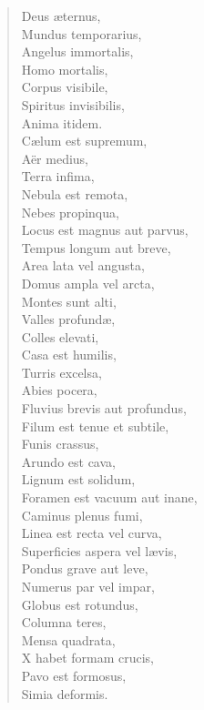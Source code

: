 \begin{verse}

  Deus æternus,\\
  Mundus temporarius,\\
  Angelus immortalis,\\
  Homo mortalis,\\
  Corpus visibile,\\
  Spiritus invisibilis,\\
  Anima itidem.\\
  Cælum est supremum,\\
  Aër medius,\\
  Terra infima,\\
  Nebula est remota,\\
  Nebes propinqua,\\
  Locus est magnus aut parvus,\\
  Tempus longum aut breve,\\
  Area lata vel angusta,\\
  Domus ampla vel arcta,\\
  Montes sunt alti,\\
  Valles profundæ,\\
  Colles elevati,\\
  Casa est humilis,\\
  Turris excelsa,\\
  Abies pocera,\\
  Fluvius brevis aut profundus,\\
  Filum est tenue et subtile,\\
  Funis crassus,\\
  Arundo est cava,\\
  Lignum est solidum,\\
  Foramen est vacuum aut inane,\\
  Caminus plenus fumi,\\
  Linea est recta vel curva,\\
  Superficies aspera vel lævis,\\
  Pondus grave aut leve,\\
  Numerus par vel impar,\\
  Globus est rotundus,\\
  Columna teres,\\
  Mensa quadrata,\\
  X habet formam crucis,\\
  Pavo est formosus,\\
  Simia deformis.\\
\end{verse}



